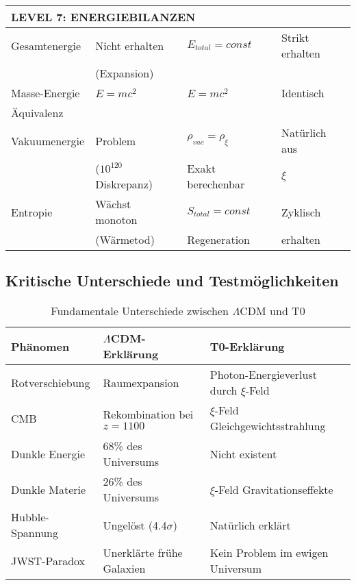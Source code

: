 \documentclass[12pt,a4paper]{article}
\begin{document}
\begin{longtable}{p{4.5cm}p{3.5cm}p{3.5cm}p{3.5cm}}
		\midrule
		\multicolumn{4}{l}{\textbf{LEVEL 7: ENERGIEBILANZEN}} \\
		\midrule
		
		Gesamtenergie & Nicht erhalten & $E_{total} = const$ & Strikt erhalten \\
		& (Expansion) & & \\[0.3em]
		
		Masse-Energie & $E = mc^2$ & $E = mc^2$ & Identisch \\
		Äquivalenz & & & \\[0.3em]
		
		Vakuumenergie & Problem & $\rho_{vac} = \rho_\xi$ & Natürlich aus \\
		& ($10^{120}$ Diskrepanz) & Exakt berechenbar & $\xi$ \\[0.3em]
		
		Entropie & Wächst monoton & $S_{total} = const$ & Zyklisch \\
		& (Wärmetod) & Regeneration & erhalten \\[0.3em]
		
	\end{longtable}
	
	\subsection{Kritische Unterschiede und Testmöglichkeiten}
	
	\begin{table}[H]
		\centering
		\begin{tabular}{p{3.5cm}p{5cm}p{5cm}}
			\toprule
			\textbf{Phänomen} & \textbf{$\Lambda$CDM-Erklärung} & \textbf{T0-Erklärung} \\
			\midrule
			Rotverschiebung & Raumexpansion & Photon-Energieverlust durch $\xi$-Feld \\
			CMB & Rekombination bei $z=1100$ & $\xi$-Feld Gleichgewichtsstrahlung \\
			Dunkle Energie & 68\% des Universums & Nicht existent \\
			Dunkle Materie & 26\% des Universums & $\xi$-Feld Gravitationseffekte \\
			Hubble-Spannung & Ungelöst (4.4$\sigma$) & Natürlich erklärt \\
			JWST-Paradox & Unerklärte frühe Galaxien & Kein Problem im ewigen Universum \\
			\bottomrule
		\end{tabular}
		\caption{Fundamentale Unterschiede zwischen $\Lambda$CDM und T0}
	\end{table}
	
\end{document}
